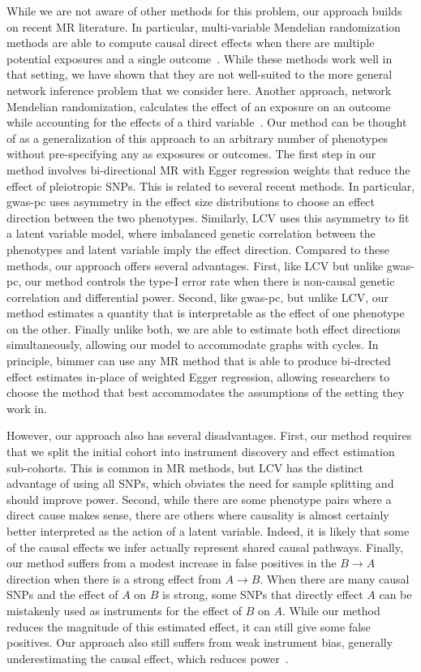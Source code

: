 \documentclass{article}
\begin{document}
While we are not aware of other methods for this problem, our approach
builds on recent MR literature. In particular, multi-variable Mendelian
randomization methods are able to compute causal direct effects when there
are multiple potential exposures and a single outcome~\cite{Zuber2020,Burgess2015a}. While
these methods work well in that setting, we have shown that they are not well-suited
to the more general network inference problem that we consider here. Another approach, network
Mendelian randomization, calculates the effect of an exposure on an outcome while
accounting for the effects of a third variable~\cite{Burgess2015}. Our method can
be thought of as a generalization of this approach to an arbitrary number of phenotypes
without pre-specifying any as exposures or outcomes. The first step in our method
involves bi-directional MR with Egger regression weights that reduce the effect
of pleiotropic SNPs. This is related to several recent methods.
In particular, gwas-pc uses asymmetry in the effect size distributions
to choose an effect direction between the two phenotypes. Similarly, 
LCV uses this asymmetry to fit a latent variable model, where imbalanced
genetic correlation between the phenotypes and latent variable imply
the effect direction. Compared to these methods, our approach offers several
advantages. First, like LCV but unlike gwas-pc, our method controls the type-I error rate
when there is non-causal genetic correlation and differential power. Second, like gwas-pc,
but unlike LCV, our method estimates a quantity that is interpretable as the
effect of one phenotype on the other. Finally unlike both,
we are able to estimate both effect directions simultaneously, allowing our
model to accommodate graphs with cycles. In principle, bimmer can use any MR method
that is able to produce bi-drected effect estimates in-place of weighted Egger
regression, allowing researchers to choose the method that best accommodates the assumptions of
the setting they work in.

However, our approach also has several disadvantages. First, our method
requires that we split the initial cohort into instrument discovery and
effect estimation sub-cohorts. This is common in MR methods, but LCV has
the distinct advantage of using all SNPs, which obviates the need
for sample splitting and should improve power. Second, while there are some
phenotype pairs where a direct cause makes sense, there are others where causality is 
almost certainly better interpreted as the action of a latent variable. Indeed, it is likely
that some of the causal effects we infer actually represent shared causal pathways.
Finally, our method suffers from a modest increase in false positives in the $B\rightarrow A$
direction when there is a strong effect from $A\rightarrow B$. When there are many
causal SNPs and the effect of $A$ on $B$ is strong, some SNPs that directly effect $A$
can be mistakenly used as instruments for the effect of $B$ on $A$. While our method
reduces the magnitude of this estimated effect, it can still give some false positives.
Our approach also still suffers from weak instrument bias, generally underestimating
the causal effect, which reduces power~\cite{Davies2015}.
\end{document}
